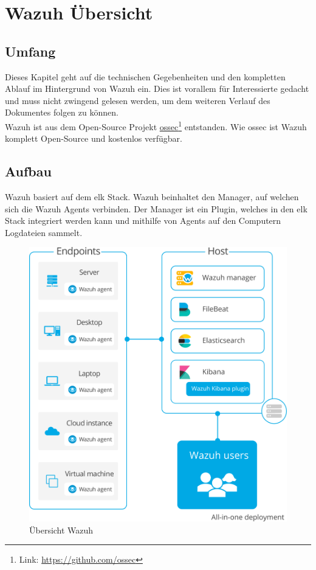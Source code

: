 \chapter{Wazuh Übersicht}
\section{Umfang}
Dieses Kapitel geht auf die technischen Gegebenheiten und den kompletten Ablauf im Hintergrund von Wazuh ein.
Dies ist vorallem für Interessierte gedacht und muss nicht zwingend gelesen werden, um dem weiteren Verlauf des Dokumentes folgen zu können.\\

Wazuh ist aus dem Open-Source Projekt \href{https://github.com/ossec}{ossec}\footnote{Link: \href{https://github.com/ossec}{https://github.com/ossec}} entstanden.
Wie ossec ist Wazuh komplett Open-Source und kostenlos verfügbar.

\section{Aufbau}

\begin{minipage}{0.4\linewidth}
Wazuh basiert auf dem \acrfull{elk} Stack.
Wazuh beinhaltet den Manager, auf welchen sich die Wazuh Agents verbinden. 
Der Manager ist ein Plugin, welches in den \acrshort{elk} Stack integriert werden kann und mithilfe von Agents auf den Computern Logdateien sammelt.

\end{minipage}
\begin{minipage}{0.6\linewidth}
    \begin{figure}[H]
        \centering
        \includegraphics[width=0.8\linewidth]{../img/aufbau-wazuh.png}
        \caption[Übersicht Wazuh]{Übersicht Wazuh\footnotemark}
    \end{figure}
    
\end{minipage}



